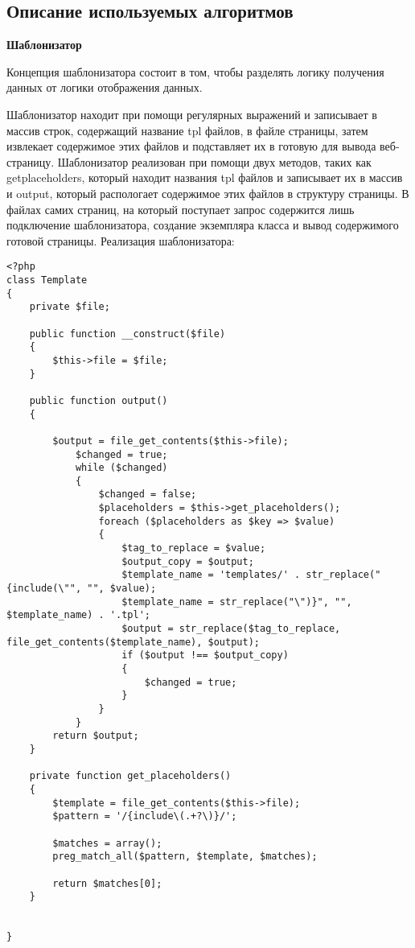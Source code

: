 \subsection{\normalsize Описание используемых алгоритмов}
\label{sec:exp:pc}
\begin{center}
\textbf{Шаблонизатор} 
\end{center}
Концепция шаблонизатора состоит в том, чтобы разделять логику получения данных от логики отображения данных.

Шаблонизатор находит при помощи регулярных выражений и  записывает в массив строк, содержащий название tpl файлов, в файле страницы, затем извлекает содержимое этих файлов и подставляет их в готовую для вывода веб-страницу.
	Шаблонизатор реализован при помощи двух методов, таких как  getplaceholders, который находит названия tpl файлов и записывает их в массив и output, который распологает содержимое этих файлов в структуру страницы.
В файлах самих страниц, на который поступает запрос содержится лишь подключение шаблонизатора, создание экземпляра класса и вывод содержимого готовой страницы.
Реализация шаблонизатора:
\begin{verbatim}
<?php
class Template
{
	private $file;
	
	public function __construct($file)
	{
		$this->file = $file;
	}
	
	public function output()
	{

		$output = file_get_contents($this->file);
			$changed = true;
			while ($changed)
			{
				$changed = false;
				$placeholders = $this->get_placeholders();
				foreach ($placeholders as $key => $value)
				{
					$tag_to_replace = $value;
					$output_copy = $output;
					$template_name = 'templates/' . str_replace("{include(\"", "", $value);
					$template_name = str_replace("\")}", "", $template_name) . '.tpl';
					$output = str_replace($tag_to_replace, file_get_contents($template_name), $output);
					if ($output !== $output_copy)
					{
						$changed = true;
					}
				}
			}		
		return $output;
	}
	
	private function get_placeholders()
	{
		$template = file_get_contents($this->file);
		$pattern = '/{include\(.+?\)}/';
		
		$matches = array();
		preg_match_all($pattern, $template, $matches);
	
		return $matches[0];
	}

	
}	
\end{verbatim}	

